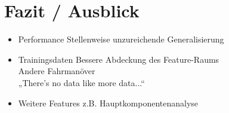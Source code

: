 
\chapter{Fazit / Ausblick} %
\label{cha:Fazit_Ausblick}
\begin{itemize}
	\item Performance
	Stellenweise unzureichende Generalisierung
	\item Trainingsdaten
	Bessere Abdeckung des Feature-Raums\\
	Andere Fahrmanöver\\
	„There's no data like more data...“
	\item Weitere Features
	z.B. Hauptkomponentenanalyse
\end{itemize}
